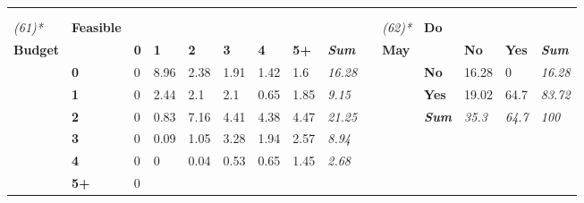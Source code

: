 \begin{table}
{\begin{threeparttable}
\begin{tabular}{lllllllllllllll}
  \textit{} &
  \textit{} &
  \textit{} &
  \textit{} \\
\textit{} &
  \textit{\textbf{}} &
  \textit{} &
  \textit{} &
  \textit{} &
  \textit{} &
  \textit{} &
  \textit{} &
  \textit{} &
  \textit{} &
  \textit{} &
  \textit{} &
  \textit{} &
  \textit{} &
  \textit{} \\
\textit{(61)*} &
  \textbf{Feasible} &
   &
   &
   &
   &
   &
   &
  \textit{} &
   &
  \textit{(62)*} &
  \textbf{Do} &
   &
   &
  \textit{} \\
\textbf{Budget} &
   &
  \textbf{0} &
  \textbf{1} &
  \textbf{2} &
  \textbf{3} &
  \textbf{4} &
  \textbf{5+} &
  \textit{\textbf{Sum}} &
  \textbf{} &
  \textbf{May} &
   &
  \textbf{No} &
  \textbf{Yes} &
  \textit{\textbf{Sum}} \\
 &
  \textbf{0} &
  \cellcolor[HTML]{FFFFFF}0 &
  \cellcolor[HTML]{BCBCBC}8.96 &
  \cellcolor[HTML]{EEEEEE}2.38 &
  \cellcolor[HTML]{F1F1F1}1.91 &
  \cellcolor[HTML]{F5F5F5}1.42 &
  \cellcolor[HTML]{F3F3F3}1.6 &
  \textit{16.28} &
   &
   &
  \textbf{No} &
  \cellcolor[HTML]{E9E9E9}16.28 &
  \cellcolor[HTML]{FFFFFF}0 &
  \textit{16.28} \\
 &
  \textbf{1} &
  \cellcolor[HTML]{FFFFFF}0 &
  \cellcolor[HTML]{EDEDED}2.44 &
  \cellcolor[HTML]{F0F0F0}2.1 &
  \cellcolor[HTML]{F0F0F0}2.1 &
  \cellcolor[HTML]{FBFBFB}0.65 &
  \cellcolor[HTML]{F2F2F2}1.85 &
  \textit{9.15} &
   &
   &
  \textbf{Yes} &
  \cellcolor[HTML]{E5E5E5}19.02 &
  \cellcolor[HTML]{A6A6A6}64.7 &
  \textit{83.72} \\
 &
  \textbf{2} &
  \cellcolor[HTML]{FFFFFF}0 &
  \cellcolor[HTML]{F9F9F9}0.83 &
  \cellcolor[HTML]{C9C9C9}7.16 &
  \cellcolor[HTML]{DEDEDE}4.41 &
  \cellcolor[HTML]{DEDEDE}4.38 &
  \cellcolor[HTML]{DEDEDE}4.47 &
  \textit{21.25} &
   &
   &
  \textit{\textbf{Sum}} &
  \textit{35.3} &
  \textit{64.7} &
  \textit{100} \\
 &
  \textbf{3} &
  \cellcolor[HTML]{FFFFFF}0 &
  \cellcolor[HTML]{FFFFFF}0.09 &
  \cellcolor[HTML]{F8F8F8}1.05 &
  \cellcolor[HTML]{E7E7E7}3.28 &
  \cellcolor[HTML]{F1F1F1}1.94 &
  \cellcolor[HTML]{ECECEC}2.57 &
  \textit{8.94} &
   &
   &
   &
   &
   &
  \textit{} \\
 &
  \textbf{4} &
  \cellcolor[HTML]{FFFFFF}0 &
  \cellcolor[HTML]{FFFFFF}0 &
  \cellcolor[HTML]{FFFFFF}0.04 &
  \cellcolor[HTML]{FBFBFB}0.53 &
  \cellcolor[HTML]{FBFBFB}0.65 &
  \cellcolor[HTML]{F5F5F5}1.45 &
  \textit{2.68} &
   &
   &
   &
   &
   &
  \textit{} \\
 &
  \textbf{5+} &
  \cellcolor[HTML]{FFFFFF}0 &

\end{tabular}
\end{threeparttable}}
\end{table}
